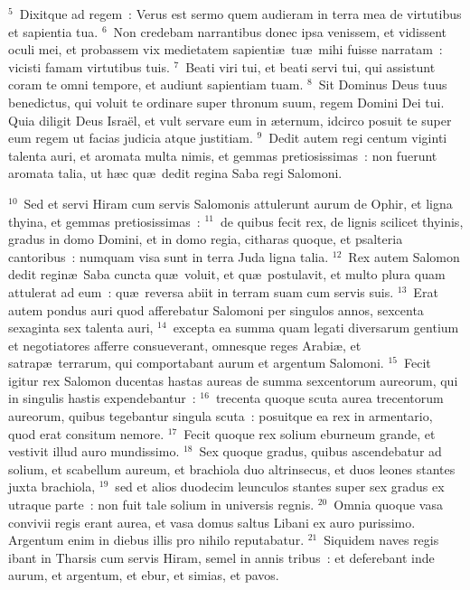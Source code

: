 ${}^{5}$~Dixitque ad regem~: Verus est sermo quem audieram in terra mea de virtutibus et sapientia tua.
${}^{6}$~Non credebam narrantibus donec ipsa venissem, et vidissent oculi mei, et probassem vix medietatem sapienti\ae\ tu\ae\ mihi fuisse narratam~: vicisti famam virtutibus tuis.
${}^{7}$~Beati viri tui, et beati servi tui, qui assistunt coram te omni tempore, et audiunt sapientiam tuam.
${}^{8}$~Sit Dominus Deus tuus benedictus, qui voluit te ordinare super thronum suum, regem Domini Dei tui. Quia diligit Deus Isra\"el, et vult servare eum in \ae ternum, idcirco posuit te super eum regem ut facias judicia atque justitiam.
${}^{9}$~Dedit autem regi centum viginti talenta auri, et aromata multa nimis, et gemmas pretiosissimas~: non fuerunt aromata talia, ut h\ae c qu\ae\ dedit regina Saba regi Salomoni.


${}^{10}$~Sed et servi Hiram cum servis Salomonis attulerunt aurum de Ophir, et ligna thyina, et gemmas pretiosissimas~:
${}^{11}$~de quibus fecit rex, de lignis scilicet thyinis, gradus in domo Domini, et in domo regia, citharas quoque, et psalteria cantoribus~: numquam visa sunt in terra Juda ligna talia.
${}^{12}$~Rex autem Salomon dedit regin\ae\ Saba cuncta qu\ae\ voluit, et qu\ae\ postulavit, et multo plura quam attulerat ad eum~: qu\ae\ reversa abiit in terram suam cum servis suis.
${}^{13}$~Erat autem pondus auri quod afferebatur Salomoni per singulos annos, sexcenta sexaginta sex talenta auri,
${}^{14}$~excepta ea summa quam legati diversarum gentium et negotiatores afferre consueverant, omnesque reges Arabi\ae , et satrap\ae\ terrarum, qui comportabant aurum et argentum Salomoni.
${}^{15}$~Fecit igitur rex Salomon ducentas hastas aureas de summa sexcentorum aureorum, qui in singulis hastis expendebantur~:
${}^{16}$~trecenta quoque scuta aurea trecentorum aureorum, quibus tegebantur singula scuta~: posuitque ea rex in armentario, quod erat consitum nemore.
${}^{17}$~Fecit quoque rex solium eburneum grande, et vestivit illud auro mundissimo.
${}^{18}$~Sex quoque gradus, quibus ascendebatur ad solium, et scabellum aureum, et brachiola duo altrinsecus, et duos leones stantes juxta brachiola,
${}^{19}$~sed et alios duodecim leunculos stantes super sex gradus ex utraque parte~: non fuit tale solium in universis regnis.
${}^{20}$~Omnia quoque vasa convivii regis erant aurea, et vasa domus saltus Libani ex auro purissimo. Argentum enim in diebus illis pro nihilo reputabatur.
${}^{21}$~Siquidem naves regis ibant in Tharsis cum servis Hiram, semel in annis tribus~: et deferebant inde aurum, et argentum, et ebur, et simias, et pavos.
